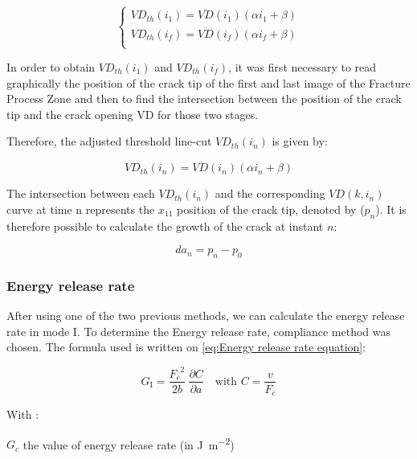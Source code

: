 \documentclass[3p,times,procedia]{elsarticle}
\begin{document}
\begin{equation}
	\begin{cases}
		VD_{th}(i_1)=\overline{VD}(i_1)(\alpha i_1 +\beta)\\
		VD_{th}(i_f)=\overline{VD}(i_f)(\alpha i_f +\beta)\\ 
	\end{cases}
	\label{eq:eq25}
\end{equation}

In order to obtain $VD_{th}(i_1)$ and $VD_{th}(i_f)$, it was first necessary to read graphically the position of the crack tip of the first and last image of the Fracture Process Zone and then to find the intersection between the position of the crack tip and the crack opening VD for those two stages.

Therefore, the adjusted threshold line-cut $VD_{th}(i_n)$ is given by:

\begin{equation}
	VD_{th}(i_n)=\overline{VD}(i_n)(\alpha i_n +\beta)
	\label{eq:eq26}
\end{equation}

The intersection between each $VD_{th}(i_n)$ and the corresponding $VD(k, i_n)$ curve at time n represents the $x_{11}$ position of the crack tip, denoted by ($p_n$).
It is therefore possible to calculate the growth of the crack at instant $n$:

\begin{equation}
	da_n=p_n-p_0
	\label{eq:eq27}
\end{equation}

\subsubsection{Energy release rate}

After using one of the two previous methods, we can calculate the energy release rate in mode I. To determine the Energy release rate, compliance method was chosen. 
The formula used is written on \ref{eq:Energy release rate equation}:

\begin{equation}
	G_\text{I}=\displaystyle\frac{{F_{c}}^2}{2b}\ \frac{\partial C}{\partial a} \quad \text{with } C=\frac{v}{F_{c}} 	
	\label{eq:Energy release rate equation}
\end{equation} 
 
With : 

$G_c$ the value of energy release rate (in \si{\joule\per\square\meter})
\end{document}

